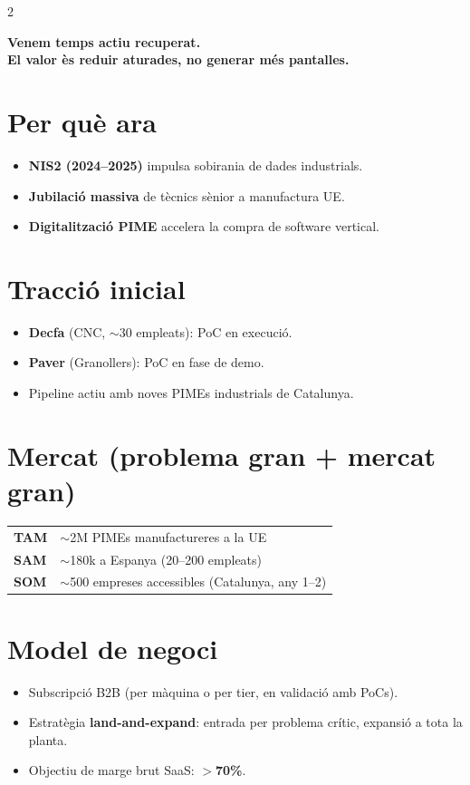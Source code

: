 \documentclass[10pt,a4paper]{article}
\begin{document}
\begin{multicols}{2}
\begin{center}
\colorbox{softgreen}{\parbox{0.94\linewidth}{\centering\small\bfseries
Venem temps actiu recuperat.\\
El valor \`es reduir aturades, no generar m\'es pantalles.
}}
\end{center}

\section{Per qu\`e ara}
\begin{itemize}[leftmargin=1em,itemsep=1pt,topsep=2pt]
\item \textbf{NIS2 (2024--2025)} impulsa sobirania de dades industrials.
\item \textbf{Jubilaci\'o massiva} de t\`ecnics s\`enior a manufactura UE.
\item \textbf{Digitalitzaci\'o PIME} accelera la compra de software vertical.
\end{itemize}

\section{Tracci\'o inicial}
\begin{itemize}[leftmargin=1em,itemsep=1pt,topsep=2pt]
\item \textbf{Decfa} (CNC, $\sim$30 empleats): PoC en execuci\'o.
\item \textbf{Paver} (Granollers): PoC en fase de demo.
\item Pipeline actiu amb noves PIMEs industrials de Catalunya.
\end{itemize}

\columnbreak

\section{Mercat (problema gran + mercat gran)}
\small
\renewcommand{\arraystretch}{1.15}
\begin{tabularx}{0.96\linewidth}{lX}
\toprule
\textbf{TAM} & $\sim$2M PIMEs manufactureres a la UE \\
\textbf{SAM} & $\sim$180k a Espanya (20--200 empleats) \\
\textbf{SOM} & $\sim$500 empreses accessibles (Catalunya, any 1--2) \\
\bottomrule
\end{tabularx}
\normalsize

\section{Model de negoci}
\begin{itemize}[leftmargin=1em,itemsep=1pt,topsep=2pt]
\item Subscripci\'o B2B (per m\`aquina o per tier, en validaci\'o amb PoCs).
\item Estrat\`egia \textbf{land-and-expand}: entrada per problema cr\'itic, expansi\'o a tota la planta.
\item Objectiu de marge brut SaaS: \textbf{$>$70\%}.
\end{itemize}


\end{multicols}
\end{document}
